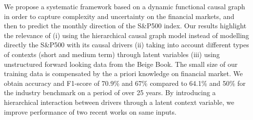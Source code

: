 
We propose a systematic framework based on a dynamic functional causal graph in order to capture complexity and uncertainty on the financial markets, and then to predict the monthly direction of the S\&P500 index. Our results highlight the relevance of (i) using the hierarchical causal graph model instead of modelling directly the S\&P500 with its causal drivers (ii) taking into account different types of contexts (short and medium term) through latent variables (iii) using unstructured forward looking data from the Beige Book. The small size of our training data is compensated by the a priori knowledge on financial market. We obtain accuracy and F1-score of 70.9\% and 67\% compared to 64.1\% and 50\% for the industry benchmark on a period of over 25 years. By introducing a hierarchical interaction between drivers through a latent context variable, we improve performance of two recent works on same inputs.\\ 


